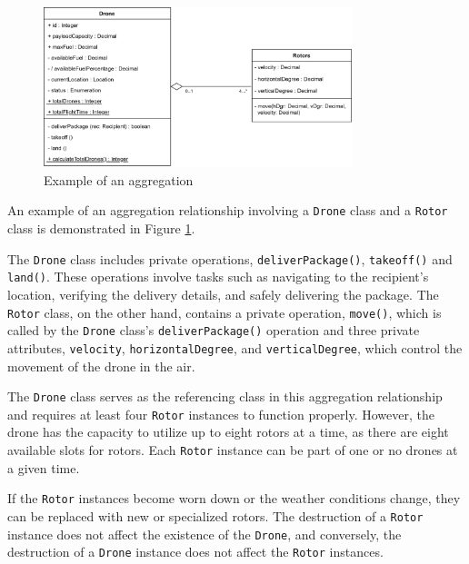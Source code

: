 \documentclass[
	12pt,
    a4paper,
    egregdoesnotlikesansseriftitles, %
    toc=chapterentrywithdots,
    oneside, openany,
    titlepage,
    parskip=half,
    headings=normal,  %
    listof=totoc,
    bibliography=totocnumbered,
    index=totoc,
    captions=tableheading,  %
    listof=flat,
    numbers=noenddot, %
    final]
    {scrbook}
\begin{document}
\begin{figure}[h]
	\centering
	\includegraphics[width=0.8\textwidth]{figures/aggr_comp/aggr.jpg}
	\caption[Example aggregation]{Example of an aggregation}
	\label{fig:aggregation_example} 
\end{figure}


An example of an aggregation relationship involving a \texttt{Drone} class and a \texttt{Rotor} class is demonstrated in Figure \ref{fig:aggregation_example}. 

The \texttt{Drone} class includes private operations, \texttt{deliverPackage()}, \texttt{takeoff()} and \texttt{land()}. 
These operations involve tasks such as navigating to the recipient's location, verifying the delivery details, and safely delivering the package.
The \texttt{Rotor} class, on the other hand, contains a private operation, \texttt{move()}, which is called by the \texttt{Drone} class's \texttt{deliverPackage()} operation and three private attributes, \texttt{velocity}, \texttt{horizontalDegree}, and \texttt{verticalDegree}, which control the movement of the drone in the air. 

The \texttt{Drone} class serves as the referencing class in this aggregation relationship and requires at least four \texttt{Rotor} instances to function properly. 
However, the drone has the capacity to utilize up to eight rotors at a time, as there are eight available slots for rotors. 
Each \texttt{Rotor} instance can be part of one or no drones at a given time.

If the \texttt{Rotor} instances become worn down or the weather conditions change, they can be replaced with new or specialized rotors. 
The destruction of a \texttt{Rotor} instance does not affect the existence of the \texttt{Drone}, and conversely, the destruction of a \texttt{Drone} instance does not affect the \texttt{Rotor} instances.
\end{document}
